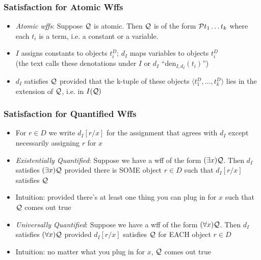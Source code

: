 \begin{frame}
\frametitle{Satisfaction for Atomic Wffs}

\begin{itemize}[<+->]

\item \emph{Atomic wffs}: Suppose $\mathcal{Q}$ is atomic. Then $\mathcal{Q}$ is of the form $\mathcal{P}t_1\dots t_k$ where each $t_i$ is a term, i.e. a constant or a variable. 

\item $I$ assigns constants to objects $t_i^D$; $d_I$ maps variables to objects $t_i^D$ \\ (the text calls these denotations under $I$ or $d_I$ ``den$_{I, d_I} (t_i)$'')

\item $d_I$ satisfies $\mathcal{Q}$ provided that the k-tuple of these objects $\langle t_1^D, \dots , t_k^D \rangle$ lies in the extension of $\mathcal{Q}$, i.e. in $I(\mathcal{Q})$


\end{itemize}
\end{frame}

\begin{frame}
\frametitle{Satisfaction for Quantified Wffs}

\begin{itemize}[<+->]

\item For $r \in D$ we write $d_I [r/x]$ for the assignment that agrees with $d_I$ except necessarily assigning $r$ for $x$

\item \emph{Existentially Quantified}: Suppose we have a wff of the form $(\exists x) \mathcal{Q}$. Then $d_I$ satisfies $(\exists x) \mathcal{Q}$ provided there is SOME object $r \in D$ such that $d_I [r/x]$ satisfies $\mathcal{Q}$
\bi
\item Intuition: provided there's at least one thing you can plug in for $x$ such that $\mathcal{Q}$ comes out true
\ei

\item \emph{Universally Quantified}: Suppose we have a wff of the form $(\forall x) \mathcal{Q}$. Then $d_I$ satisfies $(\forall x) \mathcal{Q}$ provided $d_I [r/x]$ satisfies $\mathcal{Q}$ for EACH object $r \in D$ 
\bi
\item Intuition: no matter what you plug in for $x$, $\mathcal{Q}$ comes out true
\ei


\end{itemize}
\end{frame}

